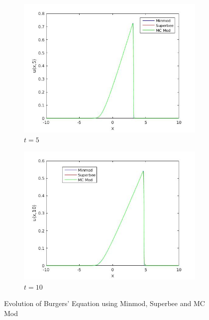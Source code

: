 \begin{figure}[H]
\begin{subfigure}[b]{0.45\textwidth}
  \includegraphics[width=\textwidth]{Images/8_msm_3.jpg}
  \caption{$t=5$}
\end{subfigure}
\begin{subfigure}[b]{0.45\textwidth}
  \includegraphics[width=\textwidth]{Images/8_msm_4.jpg}
  \caption{$t=10$}
\end{subfigure}
\caption{Evolution of Burgers' Equation using Minmod, Superbee and MC Mod}
\label{fig:burger_msm}
\end{figure}